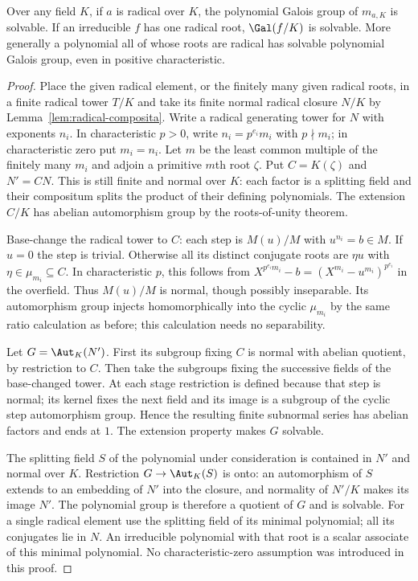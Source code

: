 \begin{theorem}
Over any field $K$, if $a$ is radical over $K$, the polynomial Galois group of $m_{a,K}$ is solvable. If an irreducible $f$ has one radical root, $\Gal(f/K)$ is solvable. More generally a polynomial all of whose roots are radical has solvable polynomial Galois group, even in positive characteristic.
\end{theorem}
\begin{proof}
Place the given radical element, or the finitely many given radical roots, in a finite radical tower $T/K$ and take its finite normal radical closure $N/K$ by Lemma~\ref{lem:radical-composita}. Write a radical generating tower for $N$ with exponents $n_i$. In characteristic $p>0$, write $n_i=p^{e_i}m_i$ with $p\nmid m_i$; in characteristic zero put $m_i=n_i$. Let $m$ be the least common multiple of the finitely many $m_i$ and adjoin a primitive $m$th root $\zeta$. Put $C=K(\zeta)$ and $N'=CN$. This is still finite and normal over $K$: each factor is a splitting field and their compositum splits the product of their defining polynomials. The extension $C/K$ has abelian automorphism group by the roots-of-unity theorem.

Base-change the radical tower to $C$: each step is $M(u)/M$ with $u^{n_i}=b\in M$. If $u=0$ the step is trivial. Otherwise all its distinct conjugate roots are $\eta u$ with $\eta\in\mu_{m_i}\subseteq C$. In characteristic $p$, this follows from $X^{p^{e_i}m_i}-b=(X^{m_i}-u^{m_i})^{p^{e_i}}$ in the overfield. Thus $M(u)/M$ is normal, though possibly inseparable. Its automorphism group injects homomorphically into the cyclic $\mu_{m_i}$ by the same ratio calculation as before; this calculation needs no separability.

Let $G=\Aut_K(N')$. First its subgroup fixing $C$ is normal with abelian quotient, by restriction to $C$. Then take the subgroups fixing the successive fields of the base-changed tower. At each stage restriction is defined because that step is normal; its kernel fixes the next field and its image is a subgroup of the cyclic step automorphism group. Hence the resulting finite subnormal series has abelian factors and ends at $1$. The extension property makes $G$ solvable.

The splitting field $S$ of the polynomial under consideration is contained in $N'$ and normal over $K$. Restriction $G\to\Aut_K(S)$ is onto: an automorphism of $S$ extends to an embedding of $N'$ into the closure, and normality of $N'/K$ makes its image $N'$. The polynomial group is therefore a quotient of $G$ and is solvable. For a single radical element use the splitting field of its minimal polynomial; all its conjugates lie in $N$. An irreducible polynomial with that root is a scalar associate of this minimal polynomial. No characteristic-zero assumption was introduced in this proof.
\end{proof}

